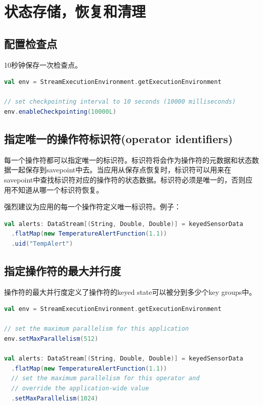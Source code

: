 \documentclass[oneside]{ctexbook}
\begin{document}
\section{状态存储，恢复和清理}

\subsection{配置检查点}

10秒钟保存一次检查点。

\begin{lstlisting}[language=scala]
val env = StreamExecutionEnvironment.getExecutionEnvironment

// set checkpointing interval to 10 seconds (10000 milliseconds)
env.enableCheckpointing(10000L)
\end{lstlisting}

\subsection{指定唯一的操作符标识符(operator identifiers)}

每一个操作符都可以指定唯一的标识符。标识符将会作为操作符的元数据和状态数据一起保存到savepoint中去。当应用从保存点恢复时，标识符可以用来在savepoint中查找标识符对应的操作符的状态数据。标识符必须是唯一的，否则应用不知道从哪一个标识符恢复。

强烈建议为应用的每一个操作符定义唯一标识符。例子：

\begin{lstlisting}[language=scala]
val alerts: DataStream[(String, Double, Double)] = keyedSensorData
  .flatMap(new TemperatureAlertFunction(1.1))  
  .uid("TempAlert")
\end{lstlisting}

\subsection{指定操作符的最大并行度}

操作符的最大并行度定义了操作符的keyed state可以被分到多少个key groups中。

\begin{lstlisting}[language=scala]
val env = StreamExecutionEnvironment.getExecutionEnvironment

// set the maximum parallelism for this application
env.setMaxParallelism(512)

val alerts: DataStream[(String, Double, Double)] = keyedSensorData
  .flatMap(new TemperatureAlertFunction(1.1))
  // set the maximum parallelism for this operator and
  // override the application-wide value
  .setMaxParallelism(1024)
\end{lstlisting}
\end{document}
